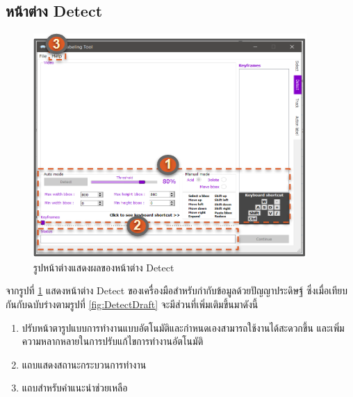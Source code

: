 \subsection*{หน้าต่าง Detect}
\begin{figure}[!ht]
  \centering
    \includegraphics[scale=1.2]{chapter4/images/New_Final_ui/Detect.png}
    \caption{รูปหน้าต่างแสดงผลของหน้าต่าง Detect}
    \label{fig:final_detect}
\end{figure}
จากรูปที่ \ref{fig:final_detect} แสดงหน้าต่าง Detect ของเครื่องมือสำหรับกำกับข้อมูลด้วยปัญญาประดิษฐ์ ซึ่งเมื่อเทียบกันกับฉบับร่างตามรูปที่ \ref{fig:DetectDraft} จะมีส่วนที่เพิ่มเติมขึ้นมาดังนี้
\begin{enumerate}
	\item ปรับหน้าตารูปแบบการทำงานแบบอัตโนมัติและกำหนดเองสามารถใช้งานได้สะดวกขึ้น และเพิ่มความหลากหลายในการปรับแก้ไขการทำงานอัตโนมัติ
	\item แถบแสดงสถานะกระบวนการทำงาน
	\item แถบสำหรับคำแนะนำช่วยเหลือ
\end{enumerate}		

\clearpage
